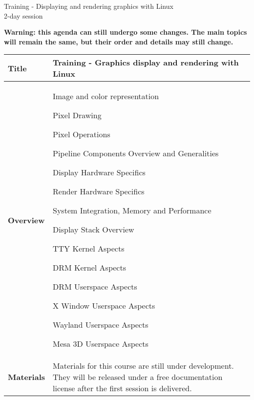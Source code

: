 \documentclass[a4paper,12pt,obeyspaces,spaces,hyphens]{article}
\begin{document}
\thispagestyle{fancy}

\setlength{\arrayrulewidth}{0.8pt}

\begin{center}
\LARGE
Training - Displaying and rendering graphics with Linux\\
\large
2-day session
\end{center}

\vspace{1cm}
{\bf Warning: this agenda can still undergo some changes.
The main topics will remain the same, but their order
and details may still change.}

\vspace{1cm}
\small
{}

 {
  \begin{tabularx}{\textwidth}{|g|h|}
    {\bf Title} & {\bf Training - Graphics display and rendering with Linux} \\
    \hline

    {\bf Overview} &
    Image and color representation \par
    Pixel Drawing \par
    Pixel Operations \par
    Pipeline Components Overview and Generalities \par
    Display Hardware Specifics \par
    Render Hardware Specifics \par
    System Integration, Memory and Performance \par
    Display Stack Overview \par
    TTY Kernel Aspects \par
    DRM Kernel Aspects \par
    DRM Userspace Aspects \par
    X Window Userspace Aspects \par
    Wayland Userspace Aspects \par
    Mesa 3D Userspace Aspects\\
    \hline
    {\bf Materials} &
     Materials for this course are still under development.
     They will be released under a free documentation license
     after the first session is delivered.\\
    \hline


\end{tabularx}}
\end{document}
